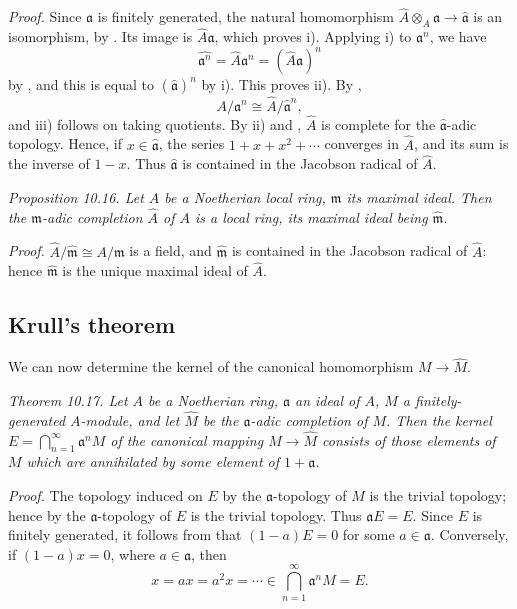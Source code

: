 \noindent\textit{Proof.} Since $\mathfrak a$ is finitely generated, the natural homomorphism $\widehat A\otimes_A\mathfrak a\longrightarrow\widehat{\mathfrak a}$ is an isomorphism, by . Its image is $\widehat A\mathfrak a$, which proves i). Applying i) to $\mathfrak a^n$, we have
\[
\widehat{\mathfrak a^n}=\widehat A\mathfrak a^n=(\widehat A\mathfrak a)^n
\]
by , and this is equal to $(\widehat{\mathfrak a})^n$ by i). This proves ii). By ,
\[
A/\mathfrak a^n\cong\widehat A/\widehat{\mathfrak a}^{n},
\]
and iii) follows on taking quotients. By ii) and , $\widehat A$ is complete for the $\widehat{\mathfrak a}$-adic topology. Hence, if $x\in\widehat{\mathfrak a}$, the series $1+x+x^2+\cdots$ converges in $\widehat A$, and its sum is the inverse of $1-x$. Thus $\widehat{\mathfrak a}$ is contained in the Jacobson radical of $\widehat A$. \proofbox

\noindent\textit{Proposition 10.16. Let $A$ be a Noetherian local ring, $\mathfrak m$ its maximal ideal. Then the $\mathfrak m$-adic completion $\widehat A$ of $A$ is a local ring, its maximal ideal being $\widehat{\mathfrak m}$.}

\noindent\textit{Proof.} $\widehat A/\widehat{\mathfrak m}\cong A/\mathfrak m$ is a field, and $\widehat{\mathfrak m}$ is contained in the Jacobson radical of $\widehat A$: hence $\widehat{\mathfrak m}$ is the unique maximal ideal of $\widehat A$. \proofbox

\subsection{Krull's theorem}

We can now determine the kernel of the canonical homomorphism $M\longrightarrow\widehat M$.

\noindent\textit{Theorem 10.17. Let $A$ be a Noetherian ring, $\mathfrak a$ an ideal of $A$, $M$ a finitely-generated $A$-module, and let $\widehat M$ be the $\mathfrak a$-adic completion of $M$. Then the kernel $E=\bigcap_{n=1}^{\infty}\mathfrak a^nM$ of the canonical mapping $M\longrightarrow\widehat M$ consists of those elements of $M$ which are annihilated by some element of $1+\mathfrak a$.}

\noindent\textit{Proof.} The topology induced on $E$ by the $\mathfrak a$-topology of $M$ is the trivial topology; hence by  the $\mathfrak a$-topology of $E$ is the trivial topology. Thus $\mathfrak aE=E$. Since $E$ is finitely generated, it follows from  that $(1-a)E=0$ for some $a\in\mathfrak a$. Conversely, if $(1-a)x=0$, where $a\in\mathfrak a$, then
\[
x=ax=a^2x=\cdots\in\bigcap_{n=1}^{\infty}\mathfrak a^nM=E.
\]
\proofbox

